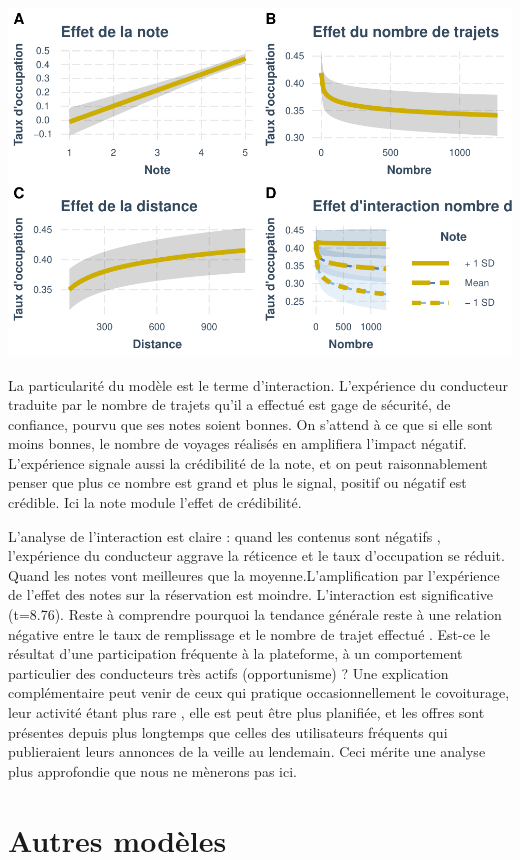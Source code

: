 \documentclass[
]{book}
\begin{document}
\includegraphics{bookdown-demo_files/figure-latex/0911-2.pdf}

La particularité du modèle est le terme d'interaction. L'expérience du conducteur traduite par le nombre de trajets qu'il a effectué est gage de sécurité, de confiance, pourvu que ses notes soient bonnes. On s'attend à ce que si elle sont moins bonnes, le nombre de voyages réalisés en amplifiera l'impact négatif. L'expérience signale aussi la crédibilité de la note, et on peut raisonnablement penser que plus ce nombre est grand et plus le signal, positif ou négatif est crédible. Ici la note module l'effet de crédibilité.

L'analyse de l'interaction est claire : quand les contenus sont négatifs , l'expérience du conducteur aggrave la réticence et le taux d'occupation se réduit. Quand les notes vont meilleures que la moyenne.L'amplification par l'expérience de l'effet des notes sur la réservation est moindre. L'interaction est significative (t=8.76). Reste à comprendre pourquoi la tendance générale reste à une relation négative entre le taux de remplissage et le nombre de trajet effectué . Est-ce le résultat d'une participation fréquente à la plateforme, à un comportement particulier des conducteurs très actifs (opportunisme) ? Une explication complémentaire peut venir de ceux qui pratique occasionnellement le covoiturage, leur activité étant plus rare , elle est peut être plus planifiée, et les offres sont présentes depuis plus longtemps que celles des utilisateurs fréquents qui publieraient leurs annonces de la veille au lendemain. Ceci mérite une analyse plus approfondie que nous ne mènerons pas ici.

\hypertarget{autres-moduxe8les}{%
\section{Autres modèles}\label{autres-moduxe8les}}
\end{document}
